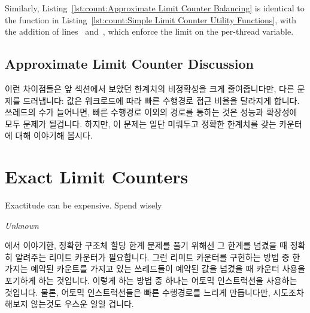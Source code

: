 \begin{lineref}
\begin{lineref}
Similarly,
Listing~\ref{lst:count:Approximate Limit Counter Balancing}
is identical to the  function in
Listing~\ref{lst:count:Simple Limit Counter Utility Functions},
with the addition of
lines~ and~, which enforce the
 limit on the per-thread  variable.
\fi
\end{lineref}

\subsection{Approximate Limit Counter Discussion}

이런 차이점들은 앞 섹션에서 보았던 한계치의 비정확성을 크게 줄여줍니다만, 다른
문제를 드러냅니다:  값은 워크로드에 따라 빠른 수행경로 접근
비율을 달라지게 합니다.
쓰레드의 수가 늘어나면, 빠른 수행경로 이외의 경로를 통하는 것은 성능과 확장성에
모두 문제가 될겁니다.
하지만, 이 문제는 일단 미뤄두고 정확한 한계치를 갖는 카운터에 대해 이야기해
봅시다.

\section{Exact Limit Counters}
\label{sec:count:Exact Limit Counters}
%
\epigraph{Exactitude can be expensive.  Spend wisely}{\emph{Unknown}}

{\QcountQexactcnt} 에서 이야기한, 정확한 구조체 할당 한계 문제를 풀기 위해선
그 한계를 넘겼을 때 정확히 알려주는 리미트 카운터가 필요합니다.
그런 리미트 카운터를 구현하는 방법 중 한가지는 예약된 카운트를 가지고 있는
쓰레드들이 예약된 값을 넘겼을 때 카운터 사용을 포기하게 하는 것입니다.
이렇게 하는 방법 중 하나는 어토믹 인스트럭션을 사용하는 것입니다.
물론, 어토믹 인스트럭션들은 빠른 수행경로를 느리게 만듭니다만, 시도조차 해보지
않는것도 우스운 일일 겁니다.

\end{lineref}
